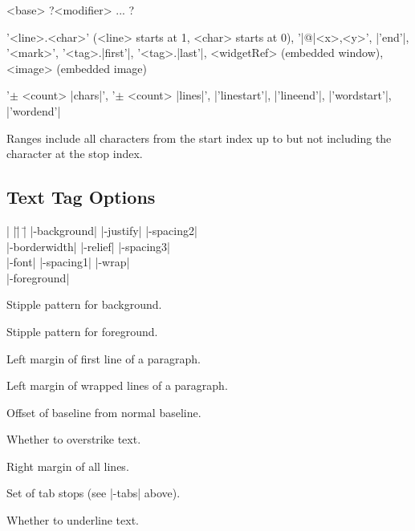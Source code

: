 \begin{enum}{2cm}

 <base> ?<modifier> ... ?

 '<line>.<char>' (<line> starts at 1, <char> starts at 0), '|@|<x>,<y>', |'end'|, '<mark>', 
	   '<tag>.|first'|, '<tag>.|last'|, <widgetRef> (embedded window), <image> (embedded image)

 '$\pm$ <count> |chars|', '$\pm$ <count> |lines|', |'linestart'|,
	       |'lineend'|, |'wordstart'|, |'wordend'|

 Ranges include all characters from the start index up to
but not including the character at the stop index.

\end{enum}
 
\subsection*{Text Tag Options}
\begin{tabbing}
|                    |\=|                    |\= \kill
|-background|         \> |-justify|         \> |-spacing2| \\
|-borderwidth|        \> |-relief|          \> |-spacing3| \\
|-font|               \> |-spacing1|        \> |-wrap| \\
|-foreground|      
\end{tabbing}

\vskip5pt
\begin{enum}{4.5cm}

 Stipple pattern for background.

 Stipple pattern for foreground.

 Left margin of first line of a paragraph.  

 Left margin of wrapped lines of a paragraph. 

 Offset of baseline from normal baseline. 

 Whether to overstrike text.

 Right margin of all lines. 

 Set of tab stops (see |-tabs| above).

 Whether to underline text. 

\end{enum}

